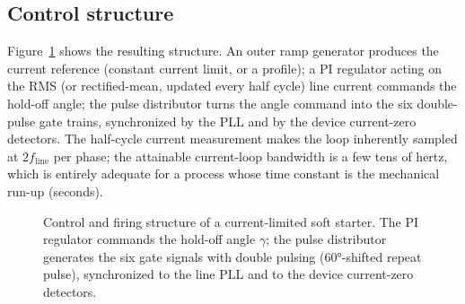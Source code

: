 \documentclass[11pt,a4paper]{article}
\begin{document}
\subsection{Control structure}

Figure~\ref{fig:controlbd} shows the resulting structure. An outer ramp
generator produces the current reference (constant current limit, or a
profile); a PI regulator acting on the RMS (or rectified-mean, updated every
half cycle) line current commands the hold-off angle; the pulse distributor
turns the angle command into the six double-pulse gate trains, synchronized
by the PLL and by the device current-zero detectors. The half-cycle current
measurement makes the loop inherently sampled at $2f_\mathrm{line}$ per
phase; the attainable current-loop bandwidth is a few tens of hertz, which
is entirely adequate for a process whose time constant is the mechanical
run-up (seconds).

\begin{figure}[htb]
\centering
{}
\caption{Control and firing structure of a current-limited soft starter.
The PI regulator commands the hold-off angle $\gamma$; the pulse
distributor generates the six gate signals with double pulsing
(\ang{60}-shifted repeat pulse), synchronized to the line PLL and to the
device current-zero detectors.}
\label{fig:controlbd}
\end{figure}
\end{document}
